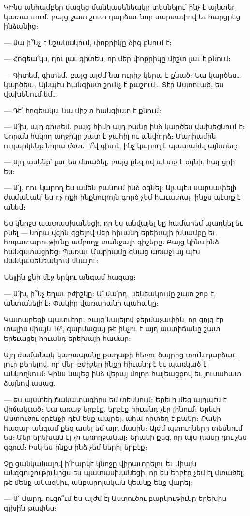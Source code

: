 ԿԻնս անհամբեր վազեց մանկասենեակը տեսնելու՝ ինչ է այնտեղ կատարւում․ բայց շատ շուտ դարձաւ նոր սարսափով եւ հարցրեց ինձանից։

— Սա ի՞նչ է նշանակում, փոքրիկը ձիգ քնում է։

— Հոգեա՛կս, դու լաւ գիտես, որ մեր փոքրիկը միշտ լաւ է քնում։

— Գիտեմ, գիտեմ․ բայց այժմ նա ուրիշ կերպ է քնած։ Նա կարծես… կարծես… Այնպէս հանգիստ շունչ է քաշում… Տէր Աստուած, ես վախենում եմ…

— Դէ՛ հոգեակս, նա միշտ հանգիստ է քնում։

— Ա՛խ, այդ գիտեմ․ բայց հիմի այդ բանը ինձ կարծես վախեցնում է։ Նորան հսկող աղջիկը շատ է ջահիլ ու անփորձ։ Մարիամին ուղարկենք նորա մօտ․ ո՞վ գիտէ, ինչ կարող է պատահել այնտեղ։

— Այդ ասենք՝ լաւ ես մտածել․ բայց քեզ ով պէտք է օգնի, հարցրի ես։

— Ա՛յ, դու կարող ես ամեն բանում ինձ օգնել։ Այսպէս սարսափելի ժամանակ՝ ես ոչ ոքի ինքնուրոյն գործ չեմ հաւատալ․ ինքս պէտք է անեմ։

Ես կնոջս պատասխանեցի, որ ես անվայել կը համարեմ պառկել եւ բնել — նորա վզին գցելով մեր հիւանդ երեխայի խնամքը եւ հոգատարութիւնը ամբողջ տանջալի գիշերը։ Բայց կինս ինձ հանգստացրեց։ Պառաւ Մարիամը գնաց առաջւայ պէս մանկասենեակում մնալու։

Նելլին քնի մէջ երկու անգամ հազաց։

— Ա՛խ, ի՞նչ եղաւ բժիշկը։ Ա՛ մա՛րդ, սենեակումը շատ շոք է, անտանելի է։ Փակիր վառարանի պահակը։

Կատարեցի պատւէրը․ բայց նայելով ջերմաչափին, որ ցոյց էր տալիս միայն 16°, զարմացայ թէ ինչու է այդ աստիճանը շատ երեւացել հիւանդ երեխայի համար։

Այդ ժամանակ կառապանը քաղաքի հեռու ծայրից տուն դարձաւ, լուր բերելով, որ մեր բժիշկը ինքը հիւանդ է եւ պառկած է անկողնում։ Կինս նայեց ինձ վերայ մոլոր հայեացքով եւ յուսահատ ձայնով ասաց․

— Ես այստեղ ճակատագիրս եմ տեսնում։ Երեւի մեզ այդպէս է վիճակւած։ Նա առաջ երբէք, երբէք հիւանդ չէր լինում։ Երեւի Աստուծու օրէնքի դէմ ենք ապրել, ահա որտեղ է բանը։ Քանի հազար անգամ քեզ ասել եմ այդ մասին։ Այժմ պտուղները տեսնում ես։ Մեր երեխան էլ չի առողջանալ։ Երանի քեզ, որ այս դասը դու չես զգում։ Իսկ ես ինքս ինձ չեմ ներիլ երբէք։

Չը ցանկանալով ի՛հարկէ կնոջը վիրաւորելու եւ միայն անզգուշութիւնիցս ես պատասխանեցի, որ ես երբէք չեմ էլ մտածել, թէ մենք անազնիւ, անբարոյական կեանք ենք վարել։

— Ա՛ մարդ, ուզո՞ւմ ես այժմ էլ Աստուծու բարկութիւնը երեխիս գլխին թափես։

